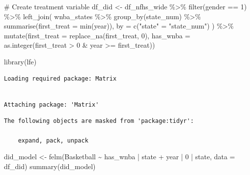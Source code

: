 \documentclass[
  letterpaper,
  DIV=11,
  numbers=noendperiod]{scrartcl}
\newenvironment{Shaded}{\begin{snugshade}}{\end{snugshade}}
\newcommand{\AttributeTok}[1]{\textcolor[rgb]{0.40,0.45,0.13}{#1}}
\newcommand{\CommentTok}[1]{\textcolor[rgb]{0.37,0.37,0.37}{#1}}
\newcommand{\DecValTok}[1]{\textcolor[rgb]{0.68,0.00,0.00}{#1}}
\newcommand{\FunctionTok}[1]{\textcolor[rgb]{0.28,0.35,0.67}{#1}}
\newcommand{\NormalTok}[1]{\textcolor[rgb]{0.00,0.23,0.31}{#1}}
\newcommand{\OtherTok}[1]{\textcolor[rgb]{0.00,0.23,0.31}{#1}}
\newcommand{\SpecialCharTok}[1]{\textcolor[rgb]{0.37,0.37,0.37}{#1}}
\newcommand{\StringTok}[1]{\textcolor[rgb]{0.13,0.47,0.30}{#1}}
\begin{document}
\begin{Shaded}
\begin{Highlighting}[]
\CommentTok{\# Create treatment variable}
\NormalTok{df\_did }\OtherTok{\textless{}{-}}\NormalTok{ df\_nfhs\_wide }\SpecialCharTok{\%\textgreater{}\%}
  \FunctionTok{filter}\NormalTok{(gender }\SpecialCharTok{==} \DecValTok{1}\NormalTok{) }\SpecialCharTok{\%\textgreater{}\%}
  \FunctionTok{left\_join}\NormalTok{(}
\NormalTok{    wnba\_states }\SpecialCharTok{\%\textgreater{}\%} \FunctionTok{group\_by}\NormalTok{(state\_num) }\SpecialCharTok{\%\textgreater{}\%} \FunctionTok{summarise}\NormalTok{(}\AttributeTok{first\_treat =} \FunctionTok{min}\NormalTok{(year)),}
    \AttributeTok{by =} \FunctionTok{c}\NormalTok{(}\StringTok{"state"} \OtherTok{=} \StringTok{"state\_num"}\NormalTok{)}
\NormalTok{  ) }\SpecialCharTok{\%\textgreater{}\%}
  \FunctionTok{mutate}\NormalTok{(}\AttributeTok{first\_treat =} \FunctionTok{replace\_na}\NormalTok{(first\_treat, }\DecValTok{0}\NormalTok{),}
         \AttributeTok{has\_wnba =} \FunctionTok{as.integer}\NormalTok{(first\_treat }\SpecialCharTok{\textgreater{}} \DecValTok{0} \SpecialCharTok{\&}\NormalTok{ year }\SpecialCharTok{\textgreater{}=}\NormalTok{ first\_treat))}

\FunctionTok{library}\NormalTok{(lfe)}
\end{Highlighting}
\end{Shaded}

\begin{verbatim}
Loading required package: Matrix
\end{verbatim}

\begin{verbatim}

Attaching package: 'Matrix'
\end{verbatim}

\begin{verbatim}
The following objects are masked from 'package:tidyr':

    expand, pack, unpack
\end{verbatim}

\begin{Shaded}
\begin{Highlighting}[]
\NormalTok{did\_model }\OtherTok{\textless{}{-}} \FunctionTok{felm}\NormalTok{(Basketball }\SpecialCharTok{\textasciitilde{}}\NormalTok{ has\_wnba }\SpecialCharTok{|}\NormalTok{ state }\SpecialCharTok{+}\NormalTok{ year }\SpecialCharTok{|} \DecValTok{0} \SpecialCharTok{|}\NormalTok{ state,}
                  \AttributeTok{data =}\NormalTok{ df\_did)}
\FunctionTok{summary}\NormalTok{(did\_model)}
\end{Highlighting}
\end{Shaded}
\end{document}
